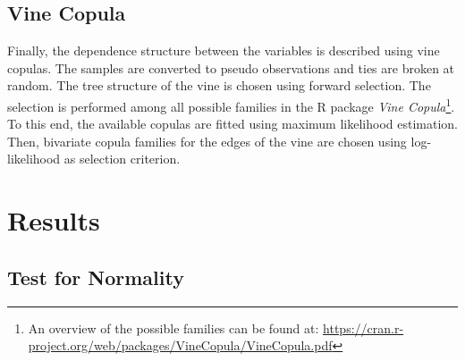 \documentclass{article}
\begin{document}
\subsection{Vine Copula}

Finally, the dependence structure between the variables is described
using vine copulas. The samples are converted to pseudo observations
and ties are broken at random. The tree structure of the vine is
chosen using forward selection. The selection is performed among all
possible families in the R package \emph{Vine Copula}\footnote{An
  overview of the possible families can be found at:
  \url{https://cran.r-project.org/web/packages/VineCopula/VineCopula.pdf}}. To
this end, the available copulas are fitted using maximum likelihood
estimation. Then, bivariate copula families for the edges of the vine
are chosen using log-likelihood as selection criterion.

                                          
\section{Results}
\label{sec:results}

\subsection{Test for Normality}
\end{document}
